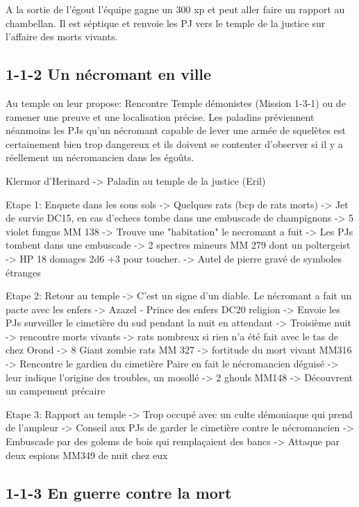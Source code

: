 A la sortie de l'égout l'équipe gagne un 300 xp et peut aller faire un rapport au chambellan. Il est
séptique et renvoie les PJ vers le temple de la justice sur l'affaire des morts vivants.

\subsection*{1-1-2 Un nécromant en ville}

Au temple on leur propose: Rencontre Temple démonistes (Mission 1-3-1) ou de ramener une preuve et une 
localisation précise. Les paladins préviennent néanmoins les PJs qu'un nécromant capable de lever une
armée de squelètes est certainement bien trop dangereux et ils doivent se contenter d'observer si il
y a réellement un nécromancien dans les égoûts.

Klermor d'Herinard -> Paladin au temple de la justice (Eril)

Etape 1: Enquete dans les sous sols 
 -> Quelques rats (bcp de rats morts)
 -> Jet de survie DC15, en cas d'echecs tombe dans une embuscade de champignons -> 5 violet fungus MM 138
 -> Trouve une "habitation" le necromant a fuit
 -> Les PJs tombent dans une embuscade -> 2 spectres mineurs MM 279 dont un poltergeist -> HP 18 domages 2d6 +3 pour toucher.
 -> Autel de pierre gravé de symboles étranges

Etape 2: Retour au temple
 -> C'est un signe d'un diable. Le nécromant a fait un pacte avec les enfers -> Azazel - Prince des enfers DC20 religion
 -> Envoie les PJs surveiller le cimetière du sud pendant la nuit en attendant
 -> Troisième nuit -> rencontre morts vivants -> rats nombreux si rien n'a été fait avec le tas de chez Orond -> 8 Giant zombie rats MM 327 -> fortitude du mort vivant MM316
 -> Rencontre le gardien du cimetière Paire en fait le nécromancien déguisé -> leur indique l'origine des troubles, un mosollé -> 2 ghouls MM148
 -> Découvrent un campement précaire

Etape 3: Rapport au temple
 -> Trop occupé avec un culte démoniaque qui prend de l'ampleur
 -> Conseil aux PJs de garder le cimetière contre le nécromancien
 -> Embuscade par des golems de bois qui remplaçaient des bancs
 -> Attaque par deux espions MM349 de nuit chez eux


\subsection*{1-1-3 En guerre contre la mort}

